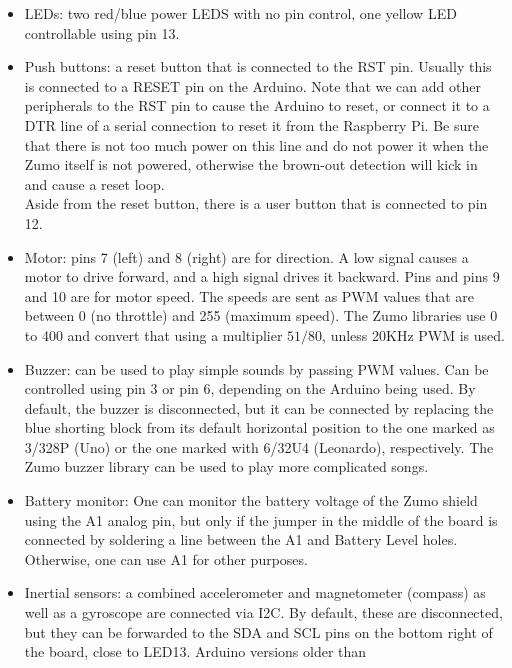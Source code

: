 \documentclass{article}
\begin{document}
\begin{itemize}
  \item LEDs: two red/blue power LEDS with no pin control, one yellow LED 
        controllable using pin 13.
  \item Push buttons: a reset button that is connected to the RST pin. Usually 
        this is connected to a RESET pin on the Arduino. Note that we can add 
        other peripherals to the RST pin to cause the Arduino to reset, or 
        connect it to a DTR line of a serial connection to reset it from the 
        Raspberry Pi. Be sure that there is not too much power on this line and 
        do not power it when the Zumo itself is not powered, otherwise the 
        brown-out detection will kick in and cause a reset loop. \\
        Aside from the reset button, there is a user button that is connected 
        to pin 12.
  \item Motor: pins 7 (left) and 8 (right) are for direction. A low signal 
        causes a motor to drive forward, and a high signal drives it backward.  
        Pins and pins 9 and 10 are for motor speed. The speeds are sent as PWM 
        values that are between 0 (no throttle) and 255 (maximum speed). The 
        Zumo libraries use 0 to 400 and convert that using a multiplier 
        $51/80$, unless 20KHz PWM is used.
  \item Buzzer: can be used to play simple sounds by passing PWM values. Can be 
        controlled using pin 3 or pin 6, depending on the Arduino being used. 
        By default, the buzzer is disconnected, but it can be connected by 
        replacing the blue shorting block from its default horizontal position 
        to the one marked as 3/328P (Uno) or the one marked with 6/32U4 
        (Leonardo), respectively. The Zumo buzzer library can be used to play 
        more complicated songs.
  \item Battery monitor: One can monitor the battery voltage of the Zumo shield 
        using the A1 analog pin, but only if the jumper in the middle of the 
        board is connected by soldering a line between the A1 and Battery Level 
        holes. Otherwise, one can use A1 for other purposes.
  \item Inertial sensors: a combined accelerometer and magnetometer (compass) 
        as well as a gyroscope are connected via I2C. By default, these are 
        disconnected, but they can be forwarded to the SDA and SCL pins on the 
        bottom right of the board, close to LED13. Arduino versions older than 

\end{itemize}
\end{document}
